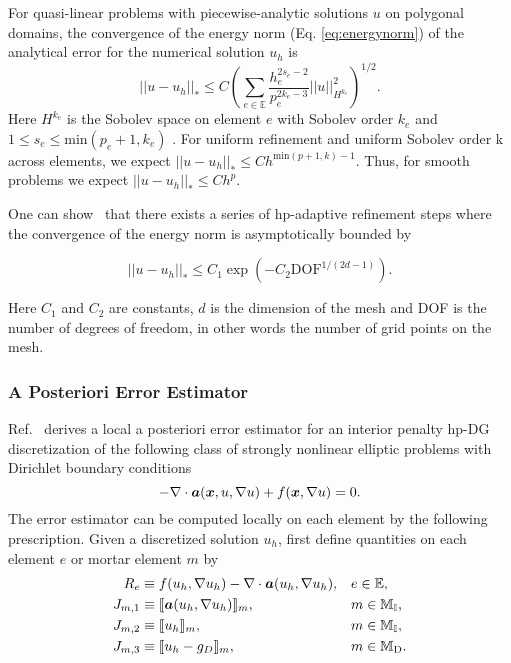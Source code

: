  For quasi-linear problems with piecewise-analytic solutions $u$ on polygonal domains, the convergence of the energy norm (Eq. \ref{eq:energynorm}) of the analytical error for the numerical solution $u_h$ is
% 
 \begin{equation}
 \label{eq:expectedconvergence}
 || u - u_h ||_* \leq C\left( \sum\limits_{e \in \mathbb{E}} \frac{ h_e^{2s_e - 2}}{ p_e^{2k_e -3}} ||u||^2_{H^{k_e}} \right)^{1/2}.
 \end{equation}
%
 Here ${H^{k_{e}}}$ is the Sobolev space on element $e$ with Sobolev order $k_{e}$ and $1 \leq s_{e} \leq \text{min}(p_{e}+1, k_{e})$ \cite{houston2007energy, houston2008posteriori,houston2005discontinuous, bi2015posteriori}. For uniform refinement and uniform Sobolev order k across elements, we expect $|| u - u_h ||_* \leq Ch^{\text{min}(p+1, k) - 1}$. Thus, for smooth problems we expect $|| u - u_h ||_* \leq Ch^{p}$.

 One can show~\cite{schotzau2014exponential} that there exists a series of hp-adaptive refinement steps where the convergence of the energy norm is asymptotically bounded by
 
  \begin{equation}
 \label{eq:expconvergence}
 ||u-u_{h}||_{*} \leq C_{1}\exp(-C_{2}\text{DOF}^{1/(2d-1)}). 
\end{equation}

Here $C_{1}$ and $C_{2}$ are constants, $d$ is the dimension of the mesh and DOF is the number of degrees of freedom, in other words the number of grid points on the mesh.


\subsubsection{A Posteriori Error Estimator}

 Ref.~\cite{bi2015posteriori} derives a local a posteriori
error estimator for an interior penalty hp-DG discretization of the
following class of strongly nonlinear elliptic problems with Dirichlet
boundary conditions
%
\begin{equation}
\label{eq:classofproblems}
-\nabla \cdot \boldsymbol{a}(\boldsymbol{x}, u, \nabla u) + f(\boldsymbol{x},\nabla u) = 0 .
\end{equation}
%
The error estimator can be computed locally on each element by the
following prescription.  Given a discretized solution $u_h$, first define  quantities on each element $e$ or mortar element $m$ by
%
\begin{subequations}
\label{eq:Eta2_Ingredients}
\begin{align}
R_{e} &\equiv f(u_{h}, \nabla u_{h}) - \nabla \cdot \boldsymbol{a}(u_{h}, \nabla u_{h}),
&& e\in \mathbb{E},\\
     J_{m,1} &\equiv \llbracket \boldsymbol{a}(u_{h}, \nabla u_{h}) \rrbracket_{m},
&&     m\in \mathbb{M_I},\\
     J_{m,2} &\equiv \llbracket u_h \rrbracket_{m},
     &&     m\in \mathbb{M_I},\\
     J_{m,3} &\equiv \llbracket  u_{h} - g_D \rrbracket_{m},
     &&     m\in \mathbb{M}_{\rm D}.
\end{align}
\end{subequations}

